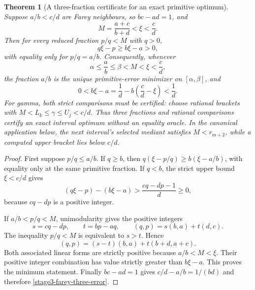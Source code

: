 \documentclass[11pt,a4paper]{article}
\newtheorem{theorem}{Theorem}[section]
\theoremstyle{definition}
\theoremstyle{remark}
\begin{document}
\begin{theorem}[A three-fraction certificate for an exact primitive optimum]
\label{stage3-farey-three-fractions}
Suppose $a/b<c/d$ are Farey neighbours, so $bc-ad=1$, and
\[
 M=\frac{a+c}{b+d}<\xi<\frac cd.
\]
Then for every reduced fraction $p/q<M$ with $q>0$,
\[
 q\xi-p\ge b\xi-a>0,
\]
with equality only for $p/q=a/b$. Consequently, whenever
\[
 \alpha\le\frac ab\le\beta<M<\xi<\frac cd,
\]
the fraction $a/b$ is the unique primitive-error minimizer on
$[\alpha,\beta]$, and
\begin{equation}\label{stage3-farey-three-error}
 0<b\xi-a
 =\frac1d-b\left(\frac cd-\xi\right)<\frac1d.
\end{equation}
For gamma, both strict comparisons must be certified: choose rational
brackets with $M<L_k\le\gamma\le U_j<c/d$.
Thus three fractions and rational comparisons certify an exact interval
optimum without an equality oracle. In the canonical application below,
the next interval's selected mediant satisfies $M<r_{m+2}$, while a
computed upper bracket lies below $c/d$.
\end{theorem}

\begin{proof}
First suppose $p/q\le a/b$. If $q\ge b$, then
$q(\xi-p/q)\ge b(\xi-a/b)$, with equality only at the same primitive
fraction. If $q<b$, the strict upper bound $\xi<c/d$ gives
\[
 (q\xi-p)-(b\xi-a)
 >
 \frac{cq-dp-1}{d}\ge0,
\]
because $cq-dp$ is a positive integer.

If $a/b<p/q<M$, unimodularity gives the positive integers
\[
 s=cq-dp,\qquad t=bp-aq,\qquad
 (q,p)=s(b,a)+t(d,c).
\]
The inequality $p/q<M$ is equivalent to $s>t$. Hence
\[
 (q,p)=(s-t)(b,a)+t(b+d,a+c).
\]
Both associated linear forms are strictly positive because
$a/b<M<\xi$. Their positive integer combination has value strictly
greater than $b\xi-a$. This proves the minimum statement.
Finally $bc-ad=1$ gives
$c/d-a/b=1/(bd)$ and therefore
\eqref{stage3-farey-three-error}.
\end{proof}
\end{document}
